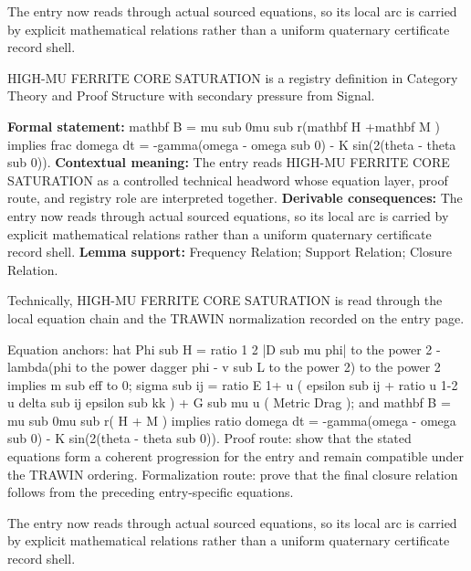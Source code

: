 The entry now reads through actual sourced equations, so its local arc is carried by explicit mathematical relations rather than a uniform quaternary certificate record shell.
\clearpage


\begingroup\small
{}
HIGH-MU FERRITE CORE SATURATION is a registry definition in Category Theory and Proof Structure with secondary pressure from Signal.

\begingroup\footnotesize\setlength{\emergencystretch}{3em}\sloppy
\textbf{Formal statement:} mathbf B = mu sub 0mu sub r(mathbf H +mathbf M ) implies frac domega dt = -gamma(omega - omega sub 0) - K sin(2(theta - theta sub 0)). \textbf{Contextual meaning:} The entry reads HIGH-MU FERRITE CORE SATURATION as a controlled technical headword whose equation layer, proof route, and registry role are interpreted together. \textbf{Derivable consequences:} The entry now reads through actual sourced equations, so its local arc is carried by explicit mathematical relations rather than a uniform quaternary certificate record shell. \textbf{Lemma support:} Frequency Relation; Support Relation; Closure Relation.\par
\endgroup

Technically, HIGH-MU FERRITE CORE SATURATION is read through the local equation chain and the TRAWIN normalization recorded on the entry page.

Equation anchors: hat Phi sub H = ratio 1 2 |D sub mu phi| to the power 2 - lambda(phi to the power dagger phi - v sub L to the power 2) to the power 2 implies m sub eff to 0; sigma sub ij = ratio E 1+ u ( epsilon sub ij + ratio u 1-2 u delta sub ij epsilon sub kk ) + G sub mu u ( Metric Drag ); and mathbf B = mu sub 0mu sub r( H + M ) implies ratio domega dt = -gamma(omega - omega sub 0) - K sin(2(theta - theta sub 0)). Proof route: show that the stated equations form a coherent progression for the entry and remain compatible under the TRAWIN ordering. Formalization route: prove that the final closure relation follows from the preceding entry-specific equations.

The entry now reads through actual sourced equations, so its local arc is carried by explicit mathematical relations rather than a uniform quaternary certificate record shell.
\endgroup


